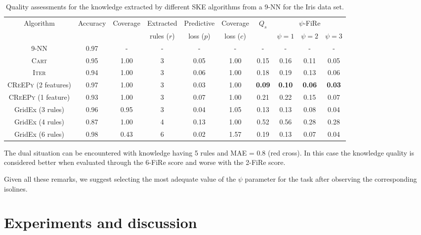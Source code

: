 \documentclass{article}
\newcommand{\iter}{\textsc{Iter}}
\newcommand{\gridex}{GridEx}
\newcommand{\creepy}{\textsc{CReEPy}}
\newcommand{\cart}{\textsc{Cart}}
\newcommand{\fire}{FiRe}
\newcommand{\psifire}{$\psi$-\fire}
\begin{document}
\begin{table}[t]\centering
	\begin{tabular}{|c||c|c|c|c|c||c|c|c|c|}
		\toprule
		Algorithm & Accuracy & Coverage & Extracted & Predictive & Coverage & $Q_s$ & \multicolumn{3}{c|}{\psifire{}} \\
		& & & rules ($r$) & loss ($p$) & loss ($c$) & & $\psi=1$ & $\psi=2$ & $\psi=3$ \\
		\midrule\midrule
		9-NN & 0.97 & - & - & - & - & - & - & - & - \\
		\midrule
		\cart{} & 0.95 & 1.00 & 3 & 0.05 & 1.00 & 0.15 & 0.16 & 0.11 & 0.05 \\
		\iter{} & 0.94 & 1.00 & 3 & 0.06 & 1.00 & 0.18 & 0.19 & 0.13 & 0.06 \\
		\creepy{} (2 features) & 0.97 & 1.00 & 3 & 0.03 & 1.00 & \textbf{0.09} & \textbf{0.10} & \textbf{0.06} & \textbf{0.03} \\
		\creepy{} (1 feature) & 0.93 & 1.00 & 3 & 0.07 & 1.00 & 0.21 & 0.22 & 0.15 & 0.07 \\
		\gridex{} (3 rules) & 0.96 & 0.95 & 3 & 0.04 & 1.05 & 0.13 & 0.13 & 0.08 & 0.04 \\
		\gridex{} (4 rules) & 0.87 & 1.00 & 4 & 0.13 & 1.00 & 0.52 & 0.56 & 0.28 & 0.28 \\
		\gridex{} (6 rules) & 0.98 & 0.43 & 6 & 0.02 & 1.57 & 0.19 & 0.13 & 0.07 & 0.04 \\
		\bottomrule
	\end{tabular}
	\caption{Quality assessments for the knowledge extracted by different SKE algorithms from a 9-NN for the Iris data set.}
	\label{tab:experiments}
\end{table}

The dual situation can be encountered with knowledge having 5 rules and MAE = 0.8 (red cross).
%
In this case the knowledge quality is considered better when evaluated through the 6-\fire{} score and worse with the 2-\fire{} score.

Given all these remarks, we suggest selecting the most adequate value of the $\psi$ parameter for the task after observing the corresponding isolines.

\section{Experiments and discussion}\label{sec:experiments}
\end{document}
